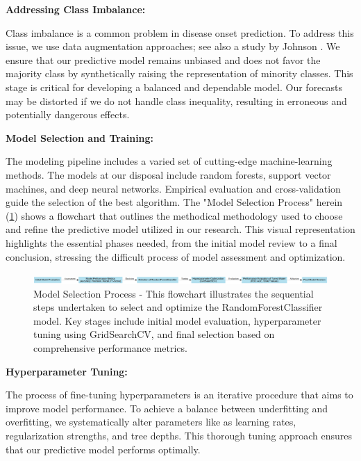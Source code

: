 \documentclass[manuscript,screen,]{acmart}
\begin{document}
\textbf{Addressing Class Imbalance:}

    Class imbalance is a common problem in disease onset prediction. To address this issue, we use data augmentation approaches; see also a study by Johnson \cite{johnson2019survey}. We ensure that our predictive model remains unbiased and does not favor the majority class by synthetically raising the representation of minority classes.
This stage is critical for developing a balanced and dependable model. Our forecasts may be distorted if we do not handle class inequality, resulting in erroneous and potentially dangerous effects.

\textbf{Model Selection and Training:}

    The modeling pipeline includes a varied set of cutting-edge machine-learning methods. The models at our disposal include random forests, support vector machines, and deep neural networks. Empirical evaluation and cross-validation guide the selection of the best algorithm.
    The "Model Selection Process" herein (\ref{fig: Model Selection Process Flowchart}) shows a flowchart that outlines the methodical methodology used to choose and refine the predictive model utilized in our research. This visual representation highlights the essential phases needed, from the initial model review to a final conclusion, stressing the difficult process of model assessment and optimization.
    
    \begin{figure}
        \centering
        \includegraphics[width=1\linewidth]{Images//Sections/Model Selection Process.png}
        \caption{Model Selection Process - This flowchart illustrates the sequential steps undertaken to select and optimize the RandomForestClassifier model. Key stages include initial model evaluation, hyperparameter tuning using GridSearchCV, and final selection based on comprehensive performance metrics.}
        \label{fig: Model Selection Process Flowchart}
    \end{figure}
    
\textbf{Hyperparameter Tuning:}

    The process of fine-tuning hyperparameters is an iterative procedure that aims to improve model performance. To achieve a balance between underfitting and overfitting, we systematically alter parameters like as learning rates, regularization strengths, and tree depths. This thorough tuning approach ensures that our predictive model performs optimally.
    
\end{document}
